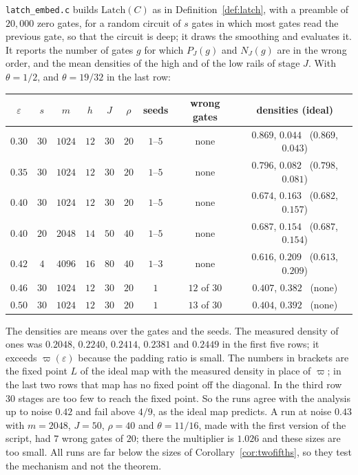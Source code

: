 \documentclass[11pt]{amsart}
\theoremstyle{definition}
\theoremstyle{remark}
\newcommand{\eps}{\varepsilon}
\begin{document}
\texttt{latch\_embed.c} builds $\mathrm{Latch}(C)$ as in Definition~\ref{def:latch}, with a
preamble of $20{,}000$ zero gates, for a random circuit of $s$ gates in which most gates read the
previous gate, so that the circuit is deep; it draws the smoothing and evaluates it. It reports
the number of gates $g$ for which $P_J(g)$ and $N_J(g)$ are in the wrong order, and the mean
densities of the high and of the low rails of stage $J$. With $\theta=1/2$, and $\theta=19/32$
in the last row:
\begin{center}
\begin{tabular}{ccccccccc}
\toprule
$\eps$ & $s$ & $m$ & $h$ & $J$ & $\rho$ & seeds & wrong gates & densities (ideal)\\
\midrule
$0.30$ & $30$ & $1024$ & $12$ & $30$ & $20$ & $1$--$5$ & none & $0.869$, $0.044$ \ ($0.869$, $0.043$)\\
$0.35$ & $30$ & $1024$ & $12$ & $30$ & $20$ & $1$--$5$ & none & $0.796$, $0.082$ \ ($0.798$, $0.081$)\\
$0.40$ & $30$ & $1024$ & $12$ & $30$ & $20$ & $1$--$5$ & none & $0.674$, $0.163$ \ ($0.682$, $0.157$)\\
$0.40$ & $20$ & $2048$ & $14$ & $50$ & $40$ & $1$--$5$ & none & $0.687$, $0.154$ \ ($0.687$, $0.154$)\\
$0.42$ & $4$ & $4096$ & $16$ & $80$ & $40$ & $1$--$3$ & none & $0.616$, $0.209$ \ ($0.613$, $0.209$)\\
$0.46$ & $30$ & $1024$ & $12$ & $30$ & $20$ & $1$ & $12$ of $30$ & $0.407$, $0.382$ \ (none)\\
$0.50$ & $30$ & $1024$ & $12$ & $30$ & $20$ & $1$ & $13$ of $30$ & $0.404$, $0.392$ \ (none)\\
\bottomrule
\end{tabular}
\end{center}
The densities are means over the gates and the seeds. The measured density of ones was $0.2048$,
$0.2240$, $0.2414$, $0.2381$ and $0.2449$ in the first five rows; it exceeds $\varpi(\eps)$
because the padding ratio is small. The numbers in brackets are the fixed point $L$ of the ideal
map with the measured density in place of $\varpi$; in the last two rows that map has no fixed
point off the diagonal. In the third row $30$ stages are too few to reach the fixed point. So the
runs agree with the analysis up to noise $0.42$ and fail above $4/9$, as the ideal map predicts.
A run at noise $0.43$ with $m=2048$, $J=50$, $\rho=40$ and $\theta=11/16$, made with the first
version of the script, had $7$ wrong gates of $20$; there the multiplier is $1.026$ and these
sizes are too small. All runs are far below the sizes of Corollary~\ref{cor:twofifths}, so they
test the mechanism and not the theorem.
\end{document}
